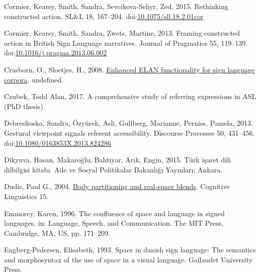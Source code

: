 \documentclass[]{elsarticle} %
\newlength{\cslhangindent}
\newenvironment{CSLReferences}[2] %
 {%
  \setlength{\parindent}{0pt}
  \ifodd #1 \everypar{\setlength{\hangindent}{\cslhangindent}}\ignorespaces\fi
  \ifnum #2 > 0
  \setlength{\parskip}{#2\baselineskip}
  \fi
 }%
 {}
\begin{document}
\begin{CSLReferences}{1}{0}
\leavevmode{}%
Cormier, Kearsy, Smith, Sandra, Sevcikova-Sehyr, Zed, 2015. Rethinking
constructed action. {SL}\&L 18, 167--204.
doi:\href{https://doi.org/10.1075/sll.18.2.01cor}{10.1075/sll.18.2.01cor}

\leavevmode{}%
Cormier, Kearsy, Smith, Sandra, Zwets, Martine, 2013. Framing
constructed action in British Sign Language narratives. Journal of
Pragmatics 55, 119--139.
doi:\href{https://doi.org/10.1016/j.pragma.2013.06.002}{10.1016/j.pragma.2013.06.002}

\leavevmode{}%
Crasborn, O., Sloetjes, H., 2008.
\href{https://www.semanticscholar.org/paper/Enhanced-ELAN-functionality-for-sign-language-Crasborn-Sloetjes/e1623ec6b2bc3532129a3682eb263cc2e7d5389c}{Enhanced
ELAN functionality for sign language corpora}. undefined.

\leavevmode{}%
Czubek, Todd Alan, 2017. A comprehensive study of referring expressions
in ASL (PhD thesis).

\leavevmode{}%
Debreslioska, Sandra, Özyürek, Asli, Gullberg, Marianne, Perniss,
Pamela, 2013. Gestural viewpoint signals referent accessibility.
Discourse Processes 50, 431--456.
doi:\href{https://doi.org/10.1080/0163853X.2013.824286}{10.1080/0163853X.2013.824286}

\leavevmode{}%
Dikyuva, Hasan, Makaroğlu, Bahtiyar, Arık, Engin, 2015. Türk i{ş}aret
dili dilbilgisi kitab{ı}. Aile ve Sosyal Politikalar Bakanl{ı}{ğ}{ı}
Yay{ı}nlar{ı}: Ankara.

\leavevmode{}%
Dudis, Paul G., 2004.
\href{https://www.degruyter.com/view/j/cogl.2004.15.issue-2/cogl.2004.009/cogl.2004.009.xml}{Body
partitioning and real-space blends}. Cognitive Linguistics 15.

\leavevmode{}%
Emmorey, Karen, 1996. The confluence of space and language in signed
languages, in: Language, Speech, and Communication. The MIT Press,
Cambridge, MA, US, pp. 171--209.

\leavevmode{}%
Engberg-Pedersen, Elisabeth, 1993. Space in danish sign language: The
semantics and morphosyntax of the use of space in a visual language.
Gallaudet University Press.


\end{CSLReferences}
\end{document}
